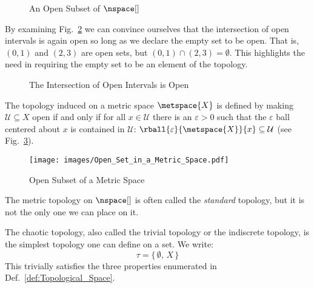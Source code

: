         \begin{figure}[H]
            \centering
            \captionsetup{type=figure}
            
            \caption{An Open Subset of $\nspace[]$}
            \label{fig:Open_Subset_of_R}
        \end{figure}
        By examining Fig.~\ref{fig:Open_Interval_Intersect_is_Open} we
        can convince ourselves that the intersection of open intervals
        is again open so long as we declare the empty set to be open.
        That is, $(0,1)$ and $(2,3)$ are open sets, but
        $(0,1)\cap(2,3)=\emptyset$. This highlights the need in
        requiring the empty set to be an element of the topology.
        \begin{figure}[H]
            \centering
            \captionsetup{type=figure}
            
            \caption{The Intersection of Open Intervals is Open}
            \label{fig:Open_Interval_Intersect_is_Open}
        \end{figure}
        \begin{example}
            The topology induced on a metric space $\metspace{X}$ is
            defined by making $\mathcal{U}\subseteq{X}$ open if and only
            if for all $x\in\mathcal{U}$ there is an $\varepsilon>0$
            such that the $\varepsilon$ ball centered about $x$ is
            contained in $\mathcal{U}$:
            $\rball{\varepsilon}{\metspace{X}}{x}\subseteq\mathcal{U}$
            (see Fig.~\ref{fig:Open_Subset_Metric_Space}).%
        \end{example}
        \begin{figure}[H]
            \centering
            \captionsetup{type=figure}
            \texttt{[image: images/Open\_Set\_in\_a\_Metric\_Space.pdf]}
            \caption{Open Subset of a Metric Space}
            \label{fig:Open_Subset_Metric_Space}
        \end{figure}
        The metric topology on $\nspace[]$ is often called the
        \textit{standard} topology, but it is not the only one we can
        place on it.
        \begin{example}
            The chaotic topology, also called the trivial topology or
            the indiscrete topology, is the simplest topology one can
            define on a set. We write:
            \begin{equation}
                \tau=\{\,\emptyset,\,X\,\}
            \end{equation}
            This trivially satisfies the three properties enumerated in
            Def.~\ref{def:Topological_Space}.
        \end{example}
